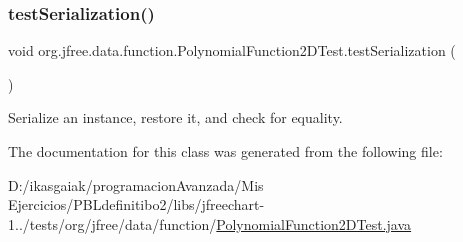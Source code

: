 \subsubsection{\texorpdfstring{test\+Serialization()}{testSerialization()}}
{\footnotesize\ttfamily void org.\+jfree.\+data.\+function.\+Polynomial\+Function2\+D\+Test.\+test\+Serialization (\begin{DoxyParamCaption}{ }\end{DoxyParamCaption})}

Serialize an instance, restore it, and check for equality. 

The documentation for this class was generated from the following file\+:\begin{DoxyCompactItemize}
\item 
D\+:/ikasgaiak/programacion\+Avanzada/\+Mis Ejercicios/\+P\+B\+Ldefinitibo2/libs/jfreechart-\/1../tests/org/jfree/data/function/\mbox{\hyperlink{_polynomial_function2_d_test_8java}{Polynomial\+Function2\+D\+Test.\+java}}\end{DoxyCompactItemize}
